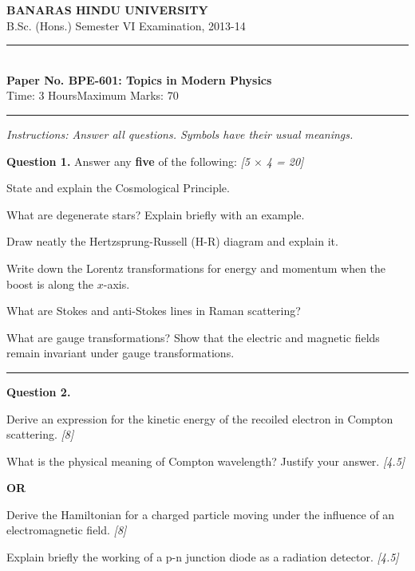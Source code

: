 \documentclass[11pt,a4paper]{article}
\newcommand{\pts}[1]{\hfill   \textit{[#1]}}
\begin{document}
\begin{center}
  {\large\bfseries BANARAS HINDU UNIVERSITY}\\[2pt]
  {\normalsize B.Sc. (Hons.) Semester VI Examination, 2013-14}\\[6pt]
  \rule{0.8\linewidth}{0.5pt}\\[6pt]
  {\large\bfseries Paper No. BPE-601: Topics in Modern Physics}\\[4pt]
  {\normalsize Time: 3 Hours\hfill Maximum Marks: 70}
\end{center}
\rule{\linewidth}{0.4pt}
\smallskip



\noindent   \textit{Instructions: Answer all questions. Symbols have their usual meanings.}
\bigskip




\noindent   \textbf{Question 1.} Answer any   \textbf{five} of the following: \pts{5 $ \times$ 4 = 20}

\begin{parts}
  \item State and explain the Cosmological Principle.
  \item What are degenerate stars? Explain briefly with an example.
  \item Draw neatly the Hertzsprung-Russell (H-R) diagram and explain it.
  \item Write down the Lorentz transformations for energy and momentum when the boost is along the $x$-axis.
  \item What are Stokes and anti-Stokes lines in Raman scattering?
  \item What are gauge transformations? Show that the electric and magnetic fields remain invariant under gauge transformations.
\end{parts}

\medskip\rule{\linewidth}{0.2pt}




\noindent   \textbf{Question 2.}

\begin{parts}
  \item Derive an expression for the kinetic energy of the recoiled electron in Compton scattering. \pts{8}
  \item What is the physical meaning of Compton wavelength? Justify your answer. \pts{4.5}
\end{parts}
\hfill   \textbf{OR}

\begin{parts}
  \item Derive the Hamiltonian for a charged particle moving under the influence of an electromagnetic field. \pts{8}
  \item Explain briefly the working of a p-n junction diode as a radiation detector. \pts{4.5}
\end{parts}
\end{document}

